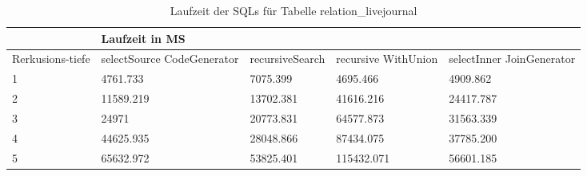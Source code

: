\begin{table}[H]
	\begin{tabular}{l|l|l|l|l|l|}
		\cline{2-6}
		& \multicolumn{5}{|l|}{Laufzeit in MS}                                                                                                                                                  \\ \hline
		\multicolumn{1}{|l|}{\multirow{2}{2cm}{Rerkusions-tiefe}} & \multicolumn{2}{|l|}{\multirow{2}{3cm}{selectSource CodeGenerator}} & \multirow{2}{2.8cm}{recursiveSearch} & \multirow{2}{2.5cm}{recursive WithUnion} & \multirow{2}{2.5cm}{selectInner JoinGenerator} \\
		\multicolumn{1}{|l|}{}
		& \multicolumn{2}{|l|}{}                                           &                                  &                                     &                                           \\ \hline
		\multicolumn{1}{|l|}{1}                                 & \multicolumn{2}{l|}{4761.733}                                    & 7075.399                                              & 4695.466                                                  & 4909.862                                                        \\ \hline
		\multicolumn{1}{|l|}{2}                                 & \multicolumn{2}{l|}{11589.219}                                   & 13702.381                                             & 41616.216                                                 & 24417.787                                                       \\ \hline
		\multicolumn{1}{|l|}{3}                                 & \multicolumn{2}{l|}{24971}                                       & 20773.831                                             & 64577.873                                                 & 31563.339                                                       \\ \hline
		\multicolumn{1}{|l|}{4}                                 & \multicolumn{2}{l|}{44625.935}                                   & 28048.866                                             & 87434.075                                                 & 37785.200                                                       \\ \hline
		\multicolumn{1}{|l|}{5}                                 & \multicolumn{2}{l|}{65632.972}                                   & 53825.401                                             & 115432.071                                                & 56601.185                                                       \\ \hline
		
	\end{tabular}
	\caption{Laufzeit der SQLs für Tabelle relation\_livejournal}
\end{table}


